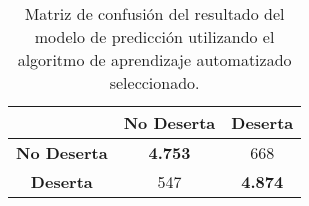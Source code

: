\begin{table}[H]
\centering
\begin{tabular}{|c|c|c|}
\hline
\textbf{} & \textbf{No Deserta} & \textbf{Deserta} \\ \hline
\textbf{No Deserta} & \cellcolor[HTML]{9AFF99}\textbf{4.753} & \cellcolor[HTML]{FFC702}668 \\ \hline
\textbf{Deserta} & \cellcolor[HTML]{FFC702}547 & \cellcolor[HTML]{9AFF99}\textbf{4.874} \\ \hline
\end{tabular}
\caption{Matriz de confusión del resultado del modelo de predicción utilizando el algoritmo de aprendizaje automatizado seleccionado.}
\label{tab:confu}
\end{table}